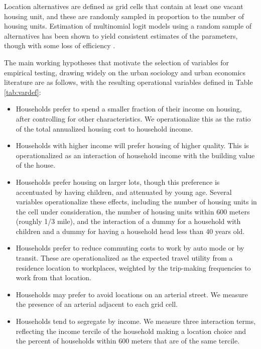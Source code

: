 \documentclass[12pt,a4paper]{article}
\begin{document}
Location alternatives are defined as grid cells that contain at
least one vacant housing unit, and these are randomly sampled in
proportion to the number of housing units.  Estimation of
multinomial logit models using a random sample of alternatives has
been shown to yield consistent estimates of the parameters, though
with some loss of efficiency \cite{ben-akiva-lerman-1987}.

The main working hypotheses that motivate the selection of variables
for empirical testing, drawing widely on the urban sociology and
urban economics literature are as follows, with the resulting
operational variables defined in Table \ref{tab:vardef}:

\begin{itemize}

\item Households prefer to spend a smaller fraction of their
income on housing, after controlling for other characteristics. We
operationalize this as the ratio of the total annualized housing
cost to household income.

\item Households with higher income will prefer housing of higher
quality.  This is operationalized as an interaction of household
income with the building value of the house.

\item Households prefer housing on larger lots, though this
preference is accentuated by having children, and attenuated by
young age.  Several variables operationalize these effects,
including the number of housing units in the cell under
consideration, the number of housing units within 600 meters
(roughly 1/3 mile), and the interaction of a dummy for a household
with children and a dummy for having a household head less than 40
years old.

\item Households prefer to reduce commuting costs to work by auto
mode or by transit.  These are operationalized as the expected
travel utility from a residence location to workplaces, weighted
by the trip-making frequencies to work from that location.

\item Households may prefer to avoid locations on an arterial
street.  We measure the presence of an arterial adjacent to each
grid cell.

\item Households tend to segregate by income.  We measure three
interaction terms, reflecting the income tercile of the household
making a location choice and the percent of households within 600
meters that are of the same tercile.


\end{itemize}
\end{document}

